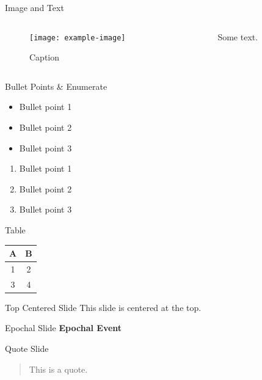 \documentclass[11pt,aspectratio=169] {beamer}
\begin{document}
\begin{frame}{Image and Text}
\begin{columns}
\begin{column}{0.4 \textwidth}
\begin{figure}
\texttt{[image: example-image]}
\caption{Caption}
\end{figure}
\end{column}
\begin{column}{0.4\textwidth}
Some text.
\end{column}
\end{columns}
\end{frame}

\begin{frame}{Bullet Points \& Enumerate}
\begin{itemize}
\item Bullet point 1
\item Bullet point 2
\item Bullet point 3
\end{itemize}
\begin{enumerate}
\item Bullet point 1
\item Bullet point 2
\item Bullet point 3
\end{enumerate}
\end{frame}

\begin{frame}{Table}
\begin{tabular}{|c|c|}
\hline
A & B \\
\hline
1 & 2 \\
3 & 4 \\
\hline
\end{tabular}
\end{frame}

\begin{frame}[t]{Top Centered Slide}
This slide is centered at the top.
\end{frame}

\begin{frame}{Epochal Slide}
\centering
\textbf{\Huge Epochal Event}
\end{frame}

\begin{frame}{Quote Slide}
\begin{quote}
This is a quote.
\end{quote}
\end{frame}
\end{document}
